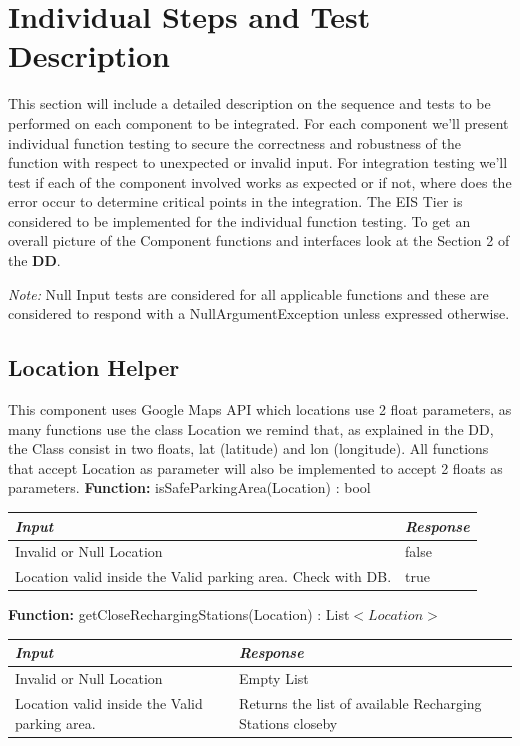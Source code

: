 \documentclass[a4paper]{article}
\begin{document}
\newpage
\section{Individual Steps and Test Description}
This section will include a detailed description on the sequence and tests to be performed on each component to be integrated. For each component we'll present individual function testing to secure the correctness and robustness of the function with respect to unexpected or invalid input. For integration testing we'll test if each of the component involved works as expected or if not, where does the error occur to determine critical points in the integration. The EIS Tier is considered to be implemented for the individual function testing. To get an overall picture of the Component functions and interfaces look at the Section 2 of the \textbf{DD}.
\par \textit{Note:} Null Input tests are considered for all applicable functions and these are considered to respond with a NullArgumentException unless expressed otherwise.
\subsection{Location Helper}
This component uses Google Maps API which locations use 2 float parameters, as many functions use the class Location we remind that, as explained in the DD, the Class consist in two floats, lat (latitude) and lon (longitude). All functions that accept Location as parameter will also be implemented to accept 2 floats as parameters. 
\newline
\newline
\textbf{Function:} isSafeParkingArea(Location) : bool
\begin{center}
\begin{tabular}{ | L{7cm} | L{5cm} | }
\hline
	\textit{Input}& \textit{Response}\\ \hline
	Invalid or Null Location & false \\ \hline
	Location valid inside the Valid parking area. Check with DB. & true \\ \hline
\end{tabular}
\end{center}

\textbf{Function:} getCloseRechargingStations(Location) : List\(<Location>\)
\begin{center}
\begin{tabular}{ | L{7cm} | L{5cm} | }
\hline
	\textit{Input}& \textit{Response}\\ \hline
	Invalid or Null Location & Empty List \\ \hline
	Location valid inside the Valid parking area. & Returns the list of available Recharging Stations closeby \\ \hline
\end{tabular}
\end{center}
\newpage 
\end{document}
